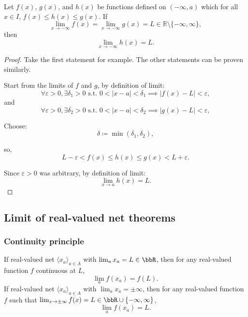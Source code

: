 Let $f(x)$, $g(x)$, and $h(x)$ be functions defined on $(-\infty,a)$ which for all $x\in I$, $f(x)\leq h(x)\leq g(x)$. If
\[\lim_{x\to-\infty}f(x)=\lim_{x\to-\infty}g(x)=L\in\mathbb{R}\setminus\{-\infty,\infty\},\]
then
\[\lim_{x\to-\infty}h(x)=L.\]
\begin{proof}
Take the first statement for example. The other statements can be proven similarly.

Start from the limits of $f$ and $g$, by definition of limit:
\[\forall\varepsilon>0, \exists\delta_1>0\text{\ s.t.\ }0<|x-a|<\delta_1\implies|f(x)-L|<\varepsilon,\]
and
\[\forall\varepsilon>0, \exists\delta_2>0\text{\ s.t.\ }0<|x-a|<\delta_2\implies|g(x)-L|<\varepsilon,\]

Choose:
\[\delta\coloneq\min(\delta_1,\delta_2),\]

so,
\[L-\varepsilon<f(x)\leq h(x)\leq g(x)<L+\varepsilon.\]

Since $\varepsilon > 0$ was arbitrary, by definition of limit:
\[\lim_{x\to a}h(x)=L.\]
\end{proof}
\subsection{Limit of real-valued net theorems}
\subsubsection{Continuity principle}
If real-valued net $\langle x_a\rangle_{a\in A}$ with $\lim_ax_a=L\in\bbR$, then for any real-valued function $f$ continuous at $L$,
\[\lim_af(x_a)=f(L).\]
If real-valued net $\langle x_a\rangle_{a\in A}$ with $\lim_ax_a=\pm\infty$, then for any real-valued function $f$ such that $\lim_{x\to\pm\infty}f(x)=L\in\bbR\cup\{-\infty,\infty\}$,
\[\lim_af(x_a)=L.\]

